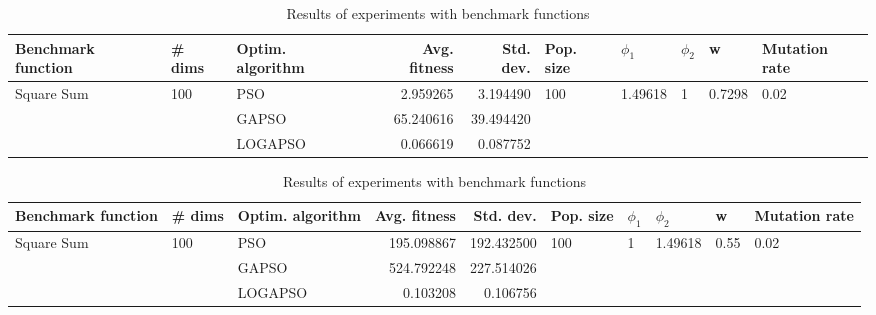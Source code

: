 \documentclass{article}
\begin{document}
\begin{table}
\centering
\caption{Results of experiments with benchmark functions}
\begin{tabular}{lllrrlllll}
\toprule
         Benchmark function &              \# dims & Optim. algorithm &  Avg. fitness &  Std. dev. &            Pop. size &               $\phi_{1}$ &         $\phi_{2}$ &                       w &         Mutation rate \\
\midrule
\multirow{3}{*}{Square Sum} & \multirow{3}{*}{100} &              PSO &      2.959265 &   3.194490 & \multirow{3}{*}{100} & \multirow{3}{*}{1.49618} & \multirow{3}{*}{1} & \multirow{3}{*}{0.7298} & \multirow{3}{*}{0.02} \\
                            &                      &            GAPSO &     65.240616 &  39.494420 &                      &                          &                    &                         &                       \\
                            &                      &          LOGAPSO &      0.066619 &   0.087752 &                      &                          &                    &                         &                       \\
\bottomrule
\end{tabular}
\end{table}
\begin{table}
\centering
\caption{Results of experiments with benchmark functions}
\begin{tabular}{lllrrlllll}
\toprule
         Benchmark function &              \# dims & Optim. algorithm &  Avg. fitness &  Std. dev. &            Pop. size &         $\phi_{1}$ &               $\phi_{2}$ &                     w &         Mutation rate \\
\midrule
\multirow{3}{*}{Square Sum} & \multirow{3}{*}{100} &              PSO &    195.098867 & 192.432500 & \multirow{3}{*}{100} & \multirow{3}{*}{1} & \multirow{3}{*}{1.49618} & \multirow{3}{*}{0.55} & \multirow{3}{*}{0.02} \\
                            &                      &            GAPSO &    524.792248 & 227.514026 &                      &                    &                          &                       &                       \\
                            &                      &          LOGAPSO &      0.103208 &   0.106756 &                      &                    &                          &                       &                       \\
\bottomrule
\end{tabular}
\end{table}
\end{document}
